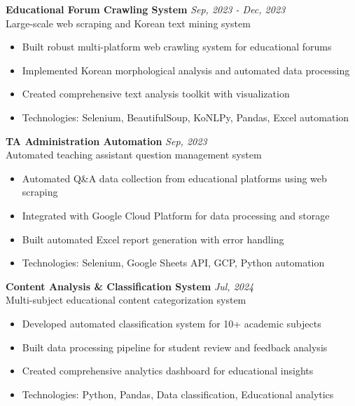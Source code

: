 \documentclass[11pt,a4paper]{article}
\begin{document}
\vspace{0.8em}

\textbf{Educational Forum Crawling System} \hfill \textcolor{textgray}{\textit{Sep, 2023 - Dec, 2023}}\\
\textcolor{textgray}{Large-scale web scraping and Korean text mining system}
\begin{itemize}[leftmargin=1em, itemsep=0.2em, topsep=0.2em]
  \item Built robust multi-platform web crawling system for educational forums
  \item Implemented Korean morphological analysis and automated data processing
  \item Created comprehensive text analysis toolkit with visualization
  \item Technologies: Selenium, BeautifulSoup, KoNLPy, Pandas, Excel automation
\end{itemize}

\vspace{0.8em}

\textbf{TA Administration Automation} \hfill \textcolor{textgray}{\textit{Sep, 2023}}\\
\textcolor{textgray}{Automated teaching assistant question management system}
\begin{itemize}[leftmargin=1em, itemsep=0.2em, topsep=0.2em]
  \item Automated Q\&A data collection from educational platforms using web scraping
  \item Integrated with Google Cloud Platform for data processing and storage
  \item Built automated Excel report generation with error handling
  \item Technologies: Selenium, Google Sheets API, GCP, Python automation
\end{itemize}

\vspace{0.8em}

\textbf{Content Analysis \& Classification System} \hfill \textcolor{textgray}{\textit{Jul, 2024}}\\
\textcolor{textgray}{Multi-subject educational content categorization system}
\begin{itemize}[leftmargin=1em, itemsep=0.2em, topsep=0.2em]
  \item Developed automated classification system for 10+ academic subjects
  \item Built data processing pipeline for student review and feedback analysis
  \item Created comprehensive analytics dashboard for educational insights
  \item Technologies: Python, Pandas, Data classification, Educational analytics
\end{itemize}
\end{document}
